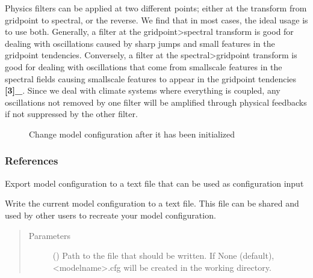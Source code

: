 \documentclass[letterpaper,10pt,english]{sphinxmanual}
\begin{document}
\begin{fulllineitems}
\begin{fulllineitems}
Physics filters can be applied at two different points; either at the transform from gridpoint
to spectral, or the reverse. We find that in most cases, the ideal usage is to use both.
Generally, a filter at the gridpoint\sphinxhyphen{}\textgreater{}spectral transform is good for dealing with oscillations
caused by sharp jumps and small features in the gridpoint tendencies. Conversely, a filter
at the spectral\sphinxhyphen{}\textgreater{}gridpoint transform is good for dealing with oscillations that come from
small\sphinxhyphen{}scale features in the spectral fields causing small\sphinxhyphen{}scale features to appear in the
gridpoint tendencies {\color{red}\bfseries{}{[}3{]}\_}. Since we deal with climate systems where everything is coupled,
any oscillations not removed by one filter will be amplified through physical feedbacks if not
suppressed by the other filter.



\begin{description}
\item[{{\hyperref[\detokenize{source/exoplasim:exoplasim.Model.modify}]{}}}] \leavevmode
Change model configuration after it has been initialized

\end{description}


\subsubsection*{References}

\end{fulllineitems}


\begin{fulllineitems}
\label{\detokenize{source/exoplasim:exoplasim.Model.exportcfg}}
Export model configuration to a text file that can be used as configuration input

Write the current model configuration to a text file. This file can be shared and used by
other users to recreate your model configuration.
\begin{quote}\begin{description}
\item[{Parameters}] \leavevmode
{} (\sphinxstyleliteralemphasis{\sphinxupquote{, }}) \textendash{} Path to the file that should be written. If None (default), \textless{}modelname\textgreater{}.cfg
will be created in the working directory.


\end{description}
\end{quote}
\end{fulllineitems}
\end{fulllineitems}
\end{document}
